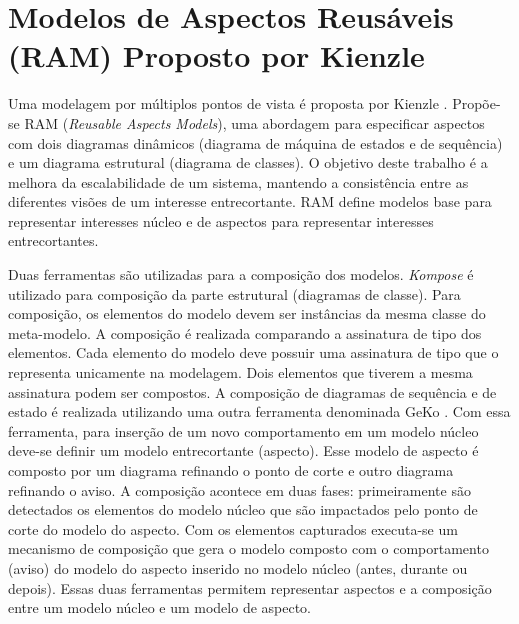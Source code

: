 \section{Modelos de Aspectos Reusáveis (RAM) Proposto por Kienzle}

Uma modelagem por múltiplos pontos de vista é proposta por Kienzle \cite{Kienzle:2009:AMM:1509239.1509252} \cite{Kienzle2010}. Propõe-se RAM
(\textit{Reusable Aspects Models}), uma abordagem para especificar aspectos com dois diagramas dinâmicos (diagrama de máquina de estados e de sequência) e um diagrama estrutural (diagrama de
classes). O objetivo deste trabalho é a melhora da escalabilidade de um sistema, mantendo a consistência entre as diferentes visões de um interesse
entrecortante. RAM define modelos base para representar interesses núcleo e de aspectos para representar interesses entrecortantes.

Duas ferramentas são utilizadas para a composição dos modelos. \textit{Kompose} \cite{kompose:07} é utilizado para composição da parte estrutural
(diagramas de classe). Para composição, os elementos do modelo devem ser instâncias da mesma classe do meta-modelo. A composição é realizada
comparando a assinatura de tipo dos elementos. Cada elemento do modelo deve possuir uma assinatura de tipo que o representa unicamente na modelagem.
Dois elementos que tiverem a mesma assinatura podem ser compostos. A composição de diagramas de sequência e de estado é realizada utilizando uma outra
ferramenta denominada GeKo \cite{geko:08}. Com essa ferramenta, para inserção de um novo comportamento em um modelo núcleo deve-se definir um modelo 
entrecortante (aspecto). Esse modelo de aspecto é composto por um diagrama refinando o ponto de corte e outro diagrama refinando o aviso. A composição
acontece em duas fases: primeiramente são detectados os elementos do modelo núcleo que são impactados pelo ponto de corte do modelo do aspecto. Com os 
elementos capturados executa-se um mecanismo de composição que gera o modelo composto com o comportamento (aviso)
do modelo do aspecto inserido no modelo núcleo (antes, durante ou depois). Essas duas ferramentas permitem representar aspectos e a composição entre
um modelo núcleo e um modelo de aspecto.

